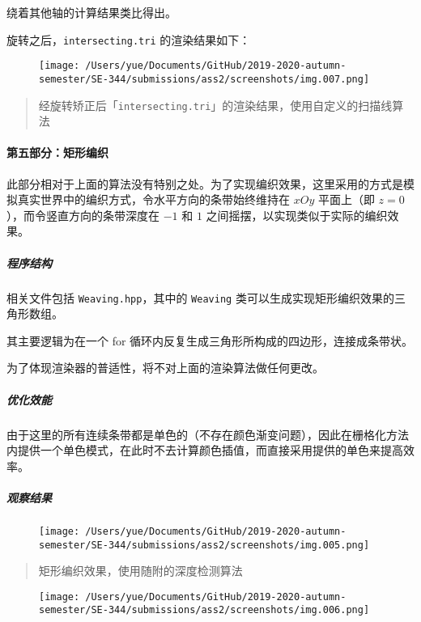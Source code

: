 \documentclass[
]{article}
\begin{document}
绕着其他轴的计算结果类比得出。

旋转之后，\texttt{intersecting.tri} 的渲染结果如下：

\begin{figure}
\centering
\texttt{[image: /Users/yue/Documents/GitHub/2019-2020-autumn-semester/SE-344/submissions/ass2/screenshots/img.007.png]}
\caption{}
\end{figure}

\begin{quote}
经旋转矫正后「\texttt{intersecting.tri}」的渲染结果，使用自定义的扫描线算法
\end{quote}

\hypertarget{header-n162}{%
\paragraph{第五部分：矩形编织}\label{header-n162}}

此部分相对于上面的算法没有特别之处。为了实现编织效果，这里采用的方式是模拟真实世界中的编织方式，令水平方向的条带始终维持在
\(xOy\) 平面上（即 \(z = 0\)），而令竖直方向的条带深度在 \(-1\) 和 \(1\)
之间摇摆，以实现类似于实际的编织效果。

\hypertarget{header-n164}{%
\subparagraph{程序结构}\label{header-n164}}

相关文件包括 \texttt{Weaving.hpp}，其中的 \texttt{Weaving}
类可以生成实现矩形编织效果的三角形数组。

其主要逻辑为在一个 for
循环内反复生成三角形所构成的四边形，连接成条带状。

为了体现渲染器的普适性，将不对上面的渲染算法做任何更改。

\hypertarget{header-n168}{%
\subparagraph{优化效能}\label{header-n168}}

由于这里的所有连续条带都是单色的（不存在颜色渐变问题），因此在栅格化方法内提供一个单色模式，在此时不去计算颜色插值，而直接采用提供的单色来提高效率。

\hypertarget{header-n170}{%
\subparagraph{观察结果}\label{header-n170}}

\begin{figure}
\centering
\texttt{[image: /Users/yue/Documents/GitHub/2019-2020-autumn-semester/SE-344/submissions/ass2/screenshots/img.005.png]}
\caption{}
\end{figure}

\begin{quote}
矩形编织效果，使用随附的深度检测算法
\end{quote}

\begin{figure}
\centering
\texttt{[image: /Users/yue/Documents/GitHub/2019-2020-autumn-semester/SE-344/submissions/ass2/screenshots/img.006.png]}
\caption{}
\end{figure}
\end{document}
